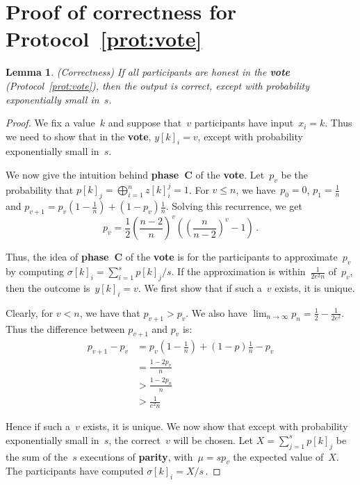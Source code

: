 \documentclass[11pt]{article}
\newtheorem{lemma}[theorem]{Lemma}
\begin{document}
\newpage




\appendix{}
\section{Proof of correctness for Protocol~\ref{prot:vote}}

\begin{lemma}(Correctness)
 If all participants are honest in  the \textbf{vote} (Protocol~\ref{prot:vote}),
then the output is correct, except with probability exponentially
small in~$s$.
\end{lemma}




\begin{proof}
We fix a value~$k$ and suppose that~$v$ participants have
input~$x_i=k$. Thus we need to show that  in the \textbf{vote},
$y[k]_i = v$,  except with probability exponentially small in~$s$.

We now give the  intuition behind \textbf{phase~C} of the
\textbf{vote}. Let~$p_v$ be the probability that
$p[k]_j=\bigoplus_{i=1}^n z[k]_i^j = 1$. For  $v \leq n$, we
have~$p_0 = 0$, $p_1 = \frac{1}{n}$ and $p_{v+1} =
p_v\left(1-\frac{1}{n}\right) + (1-p_v)\frac{1}{n}$. Solving this
recurrence, we get
\begin{equation} p_v =
\frac{1}{2}\left(\frac{n-2}{n}\right)^v
\left(\left(\frac{n}{n-2}\right)^v -1\right) \,. \end{equation}

Thus, the idea
 of \textbf{phase~C} of the \textbf{vote} is for the participants to approximate~$p_v$ by computing
\mbox{$\sigma[k]_i = \sum_{i=1}^s p[k]_j/s$}. If the approximation
is within~$\frac{1}{2e^2n}$ of~$p_v$, then the outcome
is~$y[k]_i=v$. We first show that if such a~$v$ exists, it is
unique.

Clearly,  for $v< n$, we have that $p_{v+1} > p_v$. We also have
$\lim_{n \rightarrow \infty}p_n = \frac{1}{2} - \frac{1}{2e^2}$.
Thus the difference between $p_{v+1}$ and $p_v$ is:
\begin{align}
p_{v+1} - p_v &= p_v\left(1-\frac{1}{n}\right) + (1-p)\frac{1}{n}
-p_v \\
&= \frac{1-2p_v}{n} \\
&> \frac{1-2p_n}{n} \\&>  \frac{1}{e^2n} \end{align}

Hence if
 such a~$v$ exists, it is unique. We now show
that except with probability exponentially small in~$s$, the
correct~$v$ will be chosen. Let $X= \sum_{j=1}^s p[k]_j$ be the sum
of the~$s$ executions of \textbf{parity}, with~$\mu=sp_v$ the
expected value of~$X$. The participants have computed  $\sigma[k]_i
= X/s$\,.




\end{proof}
\end{document}
